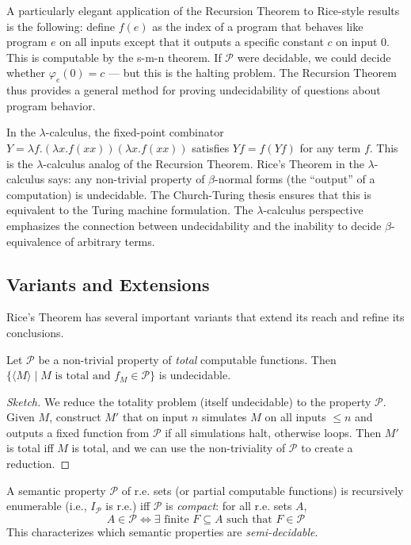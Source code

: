 A particularly elegant application of the Recursion Theorem to Rice-style results is the following: define $f(e)$ as the index of a program that behaves like program $e$ on all inputs except that it outputs a specific constant $c$ on input $0$. This is computable by the s-m-n theorem. If $\mathcal{P}$ were decidable, we could decide whether $\varphi_e(0) = c$ --- but this is the halting problem. The Recursion Theorem thus provides a general method for proving undecidability of questions about program behavior.

In the $\lambda$-calculus, the fixed-point combinator $Y = \lambda f. (\lambda x. f(xx))(\lambda x. f(xx))$ satisfies $Y f = f(Y f)$ for any term $f$. This is the $\lambda$-calculus analog of the Recursion Theorem. Rice's Theorem in the $\lambda$-calculus says: any non-trivial property of $\beta$-normal forms (the ``output'' of a computation) is undecidable. The Church-Turing thesis ensures that this is equivalent to the Turing machine formulation. The $\lambda$-calculus perspective emphasizes the connection between undecidability and the inability to decide $\beta$-equivalence of arbitrary terms.

\subsection{Variants and Extensions}
\label{sec:rice:variants}

Rice's Theorem has several important variants that extend its reach and refine its conclusions.

\begin{theorem}
Let $\mathcal{P}$ be a non-trivial property of \emph{total} computable functions. Then $\{ \langle M \rangle \mid M \text{ is total and } f_M \in \mathcal{P} \}$ is undecidable.
\end{theorem}

\begin{proof}[Sketch]
We reduce the totality problem (itself undecidable) to the property $\mathcal{P}$. Given $M$, construct $M'$ that on input $n$ simulates $M$ on all inputs $\leq n$ and outputs a fixed function from $\mathcal{P}$ if all simulations halt, otherwise loops. Then $M'$ is total iff $M$ is total, and we can use the non-triviality of $\mathcal{P}$ to create a reduction.
\end{proof}

\begin{theorem}
A semantic property $\mathcal{P}$ of r.e. sets (or partial computable functions) is recursively enumerable (i.e., $I_\mathcal{P}$ is r.e.) iff $\mathcal{P}$ is \emph{compact}: for all r.e. sets $A$,
\[
A \in \mathcal{P} \iff \exists \text{ finite } F \subseteq A \text{ such that } F \in \mathcal{P}
\]
This characterizes which semantic properties are \emph{semi-decidable}.
\end{theorem}

